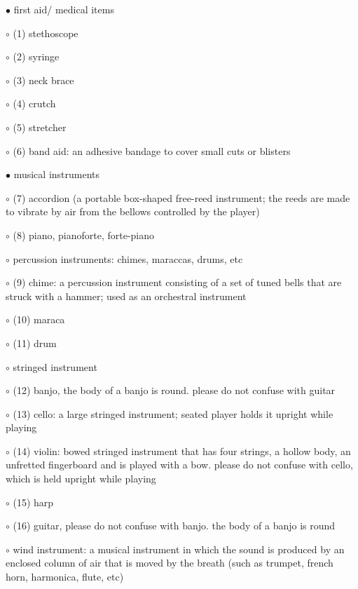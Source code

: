 \noindent \leftskip=0.0cm $\bullet$ first aid/ medical items

\noindent \leftskip=0.25cm $\circ$ (1) stethoscope

\noindent \leftskip=0.25cm $\circ$ (2) syringe

\noindent \leftskip=0.25cm $\circ$ (3) neck brace

\noindent \leftskip=0.25cm $\circ$ (4) crutch

\noindent \leftskip=0.25cm $\circ$ (5) stretcher

\noindent \leftskip=0.25cm $\circ$ (6) band aid: an adhesive bandage to cover small cuts or blisters

\noindent \leftskip=0.0cm $\bullet$ musical instruments

\noindent \leftskip=0.25cm $\circ$ (7) accordion (a portable box-shaped free-reed instrument; the reeds are made to vibrate by air from the bellows controlled by the player)

\noindent \leftskip=0.25cm $\circ$ (8) piano, pianoforte, forte-piano

\noindent \leftskip=0.25cm $\circ$ percussion instruments: chimes, maraccas, drums, etc

\noindent \leftskip=0.5cm $\circ$ (9) chime: a percussion instrument consisting of a set of tuned bells that are struck with a hammer; used as an orchestral instrument

\noindent \leftskip=0.5cm $\circ$ (10) maraca

\noindent \leftskip=0.5cm $\circ$ (11) drum

\noindent \leftskip=0.25cm $\circ$ stringed instrument

\noindent \leftskip=0.5cm $\circ$ (12) banjo, the body of a banjo is round.  please do not confuse with guitar

\noindent \leftskip=0.5cm $\circ$ (13) cello: a large stringed instrument; seated player holds it upright while playing

\noindent \leftskip=0.5cm $\circ$ (14) violin: bowed stringed instrument that has four strings, a hollow body, an unfretted fingerboard and is played with a bow. please do not confuse with cello, which is held upright while playing

\noindent \leftskip=0.5cm $\circ$ (15) harp

\noindent \leftskip=0.5cm $\circ$ (16) guitar, please do not confuse with banjo.  the body of a banjo is round

\noindent \leftskip=0.25cm $\circ$ wind instrument: a musical instrument in which the sound is produced by an enclosed column of air that is moved by the breath (such as trumpet, french horn, harmonica, flute, etc)

